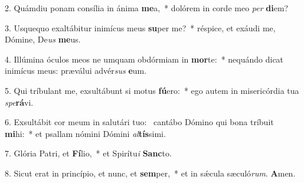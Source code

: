 2. Quámdiu ponam consília in ánima \textbf{me}a,~*  dolórem in corde meo \textit{per} \textbf{di}em?\

3. Usquequo exaltábitur inimícus meus \textbf{su}per me?~*  réspice, et exáudi me, Dómine, De\textit{us} \textbf{me}us.\

4. Illúmina óculos meos ne umquam obdórmiam in \textbf{mor}te:~*  nequándo dicat inimícus meus: præválui advér\textit{sus} \textbf{e}um.\

5. Qui tríbulant me, exsultábunt si motus \textbf{fú}ero:~*  ego autem in misericórdia tua \textit{spe}\textbf{rá}vi.\

6. Exsultábit cor meum in salutári tuo: \dag\  cantábo Dómino qui bona tríbuit \textbf{mi}hi:~*  et psallam nómini Dómini \textit{al}\textbf{tís}simi.\

7. Glória Patri, et \textbf{Fí}lio,~*  et Spirítu\textit{i} \textbf{Sanc}to.\

8. Sicut erat in princípio, et nunc, et \textbf{sem}per,~*  et in sǽcula sæculó\textit{rum}. \textbf{A}men.\

